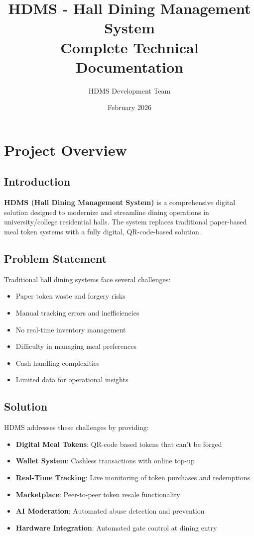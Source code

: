\documentclass[11pt,a4paper]{report}
\title{
    \Huge \textbf{HDMS - Hall Dining Management System} \\[0.5em] 
    \Large Complete Technical Documentation
}
\author{HDMS Development Team}
\date{February 2026}
\begin{document}
\maketitle

\tableofcontents
\newpage

\chapter{Project Overview}

\section{Introduction}
\textbf{HDMS (Hall Dining Management System)} is a comprehensive digital solution designed to modernize and streamline dining operations in university/college residential halls. The system replaces traditional paper-based meal token systems with a fully digital, QR-code-based solution.

\section{Problem Statement}
Traditional hall dining systems face several challenges:
\begin{itemize}
    \item Paper token waste and forgery risks
    \item Manual tracking errors and inefficiencies
    \item No real-time inventory management
    \item Difficulty in managing meal preferences
    \item Cash handling complexities
    \item Limited data for operational insights
\end{itemize}

\section{Solution}
HDMS addresses these challenges by providing:
\begin{itemize}
    \item \textbf{Digital Meal Tokens}: QR-code based tokens that can't be forged
    \item \textbf{Wallet System}: Cashless transactions with online top-up
    \item \textbf{Real-Time Tracking}: Live monitoring of token purchases and redemptions
    \item \textbf{Marketplace}: Peer-to-peer token resale functionality
    \item \textbf{AI Moderation}: Automated abuse detection and prevention
    \item \textbf{Hardware Integration}: Automated gate control at dining entry
\end{itemize}
\end{document}
